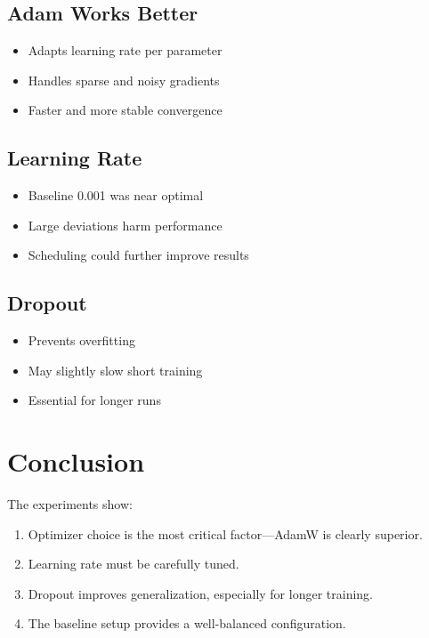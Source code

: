 \documentclass{article}
\begin{document}
\subsection{Adam Works Better}
\begin{itemize}
    \item Adapts learning rate per parameter  
    \item Handles sparse and noisy gradients  
    \item Faster and more stable convergence
\end{itemize}

\subsection{Learning Rate}
\begin{itemize}
    \item Baseline 0.001 was near optimal  
    \item Large deviations harm performance  
    \item Scheduling could further improve results
\end{itemize}

\subsection{Dropout}
\begin{itemize}
    \item Prevents overfitting  
    \item May slightly slow short training  
    \item Essential for longer runs
\end{itemize}

 

\section{Conclusion}

The experiments show:

\begin{enumerate}
    \item Optimizer choice is the most critical factor—AdamW is clearly superior.
    \item Learning rate must be carefully tuned.
    \item Dropout improves generalization, especially for longer training.
    \item The baseline setup provides a well-balanced configuration.
\end{enumerate}

 
\end{document}
